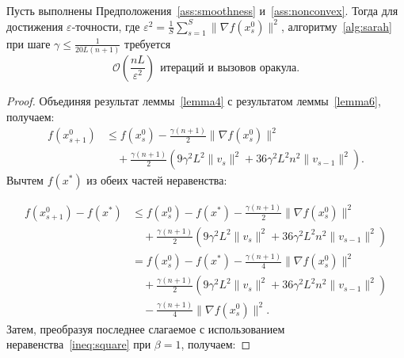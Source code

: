 \begin{theorem}\label{theorem3}
Пусть выполнены Предположения~\ref{ass:smoothness} и~\ref{ass:nonconvex}. Тогда для достижения \(\varepsilon\)-точности, где \(\varepsilon^2 = \frac{1}{S}\sum\limits_{s=1}^{S} \|\nabla f(x_s^0)\|^2\), алгоритму~\ref{alg:sarah} при шаге \(\gamma \leqslant \frac{1}{20L(n+1)}\) требуется
\begin{equation*}
    \mathcal{O} \left(\frac{nL}{\varepsilon^2}\right) ~~ \text{итераций и вызовов оракула.}
\end{equation*}

        \begin{proof}
Объединяя результат леммы~\ref{lemma4} с результатом леммы~\ref{lemma6}, получаем:
        \begin{align*}
            f(x_{s+1}^0) &\leqslant f(x_s^0) - \frac{\gamma(n+1)}{2}\|\nabla f(x_s^0)\|^2 \\
            & \quad + \frac{\gamma(n+1)}{2}\left(9\gamma^2L^2\|v_{s}\|^2 + 36\gamma^2L^2n^2\|v_{s-1}\|^2\right).
        \end{align*}
Вычтем \(f(x^*)\) из обеих частей неравенства:

        \begin{align*}
            f(x_{s+1}^0) - f(x^*) &\leqslant f(x_s^0) - f(x^*) - \frac{\gamma(n+1)}{2}\|\nabla f(x_s^0)\|^2 \\
            & \quad + \frac{\gamma(n+1)}{2}\left(9\gamma^2L^2\|v_{s}\|^2 + 36\gamma^2L^2n^2\|v_{s-1}\|^2\right)\\
            & = f(x_s^0) - f(x^*) - \frac{\gamma(n+1)}{4}\|\nabla f(x_s^0)\|^2 \\
            & \quad + \frac{\gamma(n+1)}{2}\left(9\gamma^2L^2\|v_{s}\|^2 + 36\gamma^2L^2n^2\|v_{s-1}\|^2\right) \\
            & \quad - \frac{\gamma(n+1)}{4}\|\nabla f(x_s^0)\|^2.
            \end{align*}
Затем, преобразуя последнее слагаемое с использованием неравенства~\eqref{ineq:square} при \(\beta = 1\), получаем:


\end{proof}
\end{theorem}
